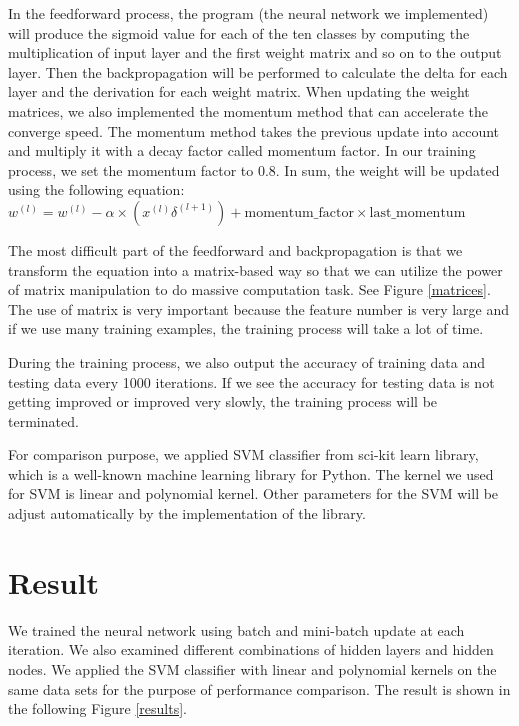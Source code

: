 \documentclass[11pt,letterpaper]{article}
\begin{document}
In the feedforward process, the program (the neural network we implemented) will produce the sigmoid value for each of the ten classes by computing the multiplication of input layer and the first weight matrix and so on to the output layer. Then the backpropagation will be performed to calculate the delta for each layer and the derivation for each weight matrix. When updating the weight matrices, we also implemented the momentum method that can accelerate the converge speed. The momentum method takes the previous update into account and multiply it with a decay factor called momentum factor. In our training process, we set the momentum factor to 0.8. In sum, the weight will be updated using the following equation: $w^{(l)} = w^{(l)} - \alpha \times (x^{(l)} \delta^{(l+1)}) + \mathrm{momentum\_factor} \times \mathrm{last\_momentum}$

The most difficult part of the feedforward and backpropagation is that we transform the equation into a matrix-based way so that we can utilize the power of matrix manipulation to do massive computation task. See Figure \ref{matrices}. The use of matrix is very important because the feature number is very large and if we use many training examples, the training process will take a lot of time. 

During the training process, we also output the accuracy of training data and testing data every 1000 iterations. If we see the accuracy for testing data is not getting improved or improved very slowly, the training process will be terminated.

For comparison purpose, we applied SVM classifier from sci-kit learn library, which is a well-known machine learning library for Python. The kernel we used for SVM is linear and polynomial kernel. Other parameters for the SVM will be adjust automatically by the implementation of the library.


\section{Result}
We trained the neural network using batch and mini-batch update at each iteration. We also examined different combinations of hidden layers and hidden nodes. We applied the SVM classifier with linear and polynomial kernels on the same data sets for the purpose of performance comparison. The result is shown in the following Figure \ref{results}. 
\end{document}
